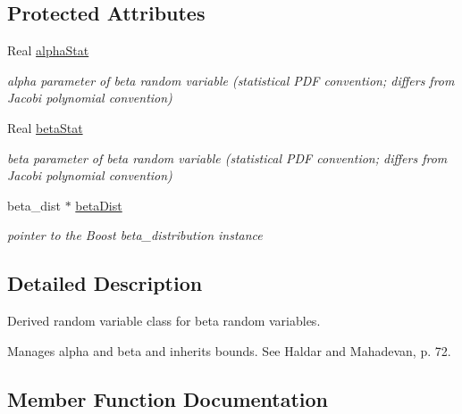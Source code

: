 \subsection*{Protected Attributes}
\begin{DoxyCompactItemize}
\item 
Real \hyperlink{classPecos_1_1BetaRandomVariable_aa48da95b9214d9cf933e1d4625e32e84}{alpha\+Stat}\label{classPecos_1_1BetaRandomVariable_aa48da95b9214d9cf933e1d4625e32e84}

\begin{DoxyCompactList}\small\item\em alpha parameter of beta random variable (statistical P\+DF convention; differs from Jacobi polynomial convention) \end{DoxyCompactList}\item 
Real \hyperlink{classPecos_1_1BetaRandomVariable_a838d220373c3360feec45e853b0daaac}{beta\+Stat}\label{classPecos_1_1BetaRandomVariable_a838d220373c3360feec45e853b0daaac}

\begin{DoxyCompactList}\small\item\em beta parameter of beta random variable (statistical P\+DF convention; differs from Jacobi polynomial convention) \end{DoxyCompactList}\item 
beta\+\_\+dist $\ast$ \hyperlink{classPecos_1_1BetaRandomVariable_a09cc5637bd2b75284abc85d89473e3a5}{beta\+Dist}\label{classPecos_1_1BetaRandomVariable_a09cc5637bd2b75284abc85d89473e3a5}

\begin{DoxyCompactList}\small\item\em pointer to the Boost beta\+\_\+distribution instance \end{DoxyCompactList}\end{DoxyCompactItemize}


\subsection{Detailed Description}
Derived random variable class for beta random variables. 

Manages alpha and beta and inherits bounds. See Haldar and Mahadevan, p. 72. 

\subsection{Member Function Documentation}
